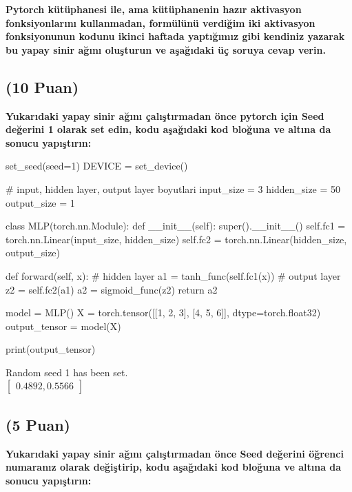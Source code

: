 \documentclass[11pt]{article}
\begin{document}
\vspace{.2in}
 \textbf{Pytorch kütüphanesi ile, ama kütüphanenin hazır aktivasyon fonksiyonlarını kullanmadan, formülünü verdiğim iki aktivasyon fonksiyonunun kodunu ikinci haftada yaptığımız gibi kendiniz yazarak bu yapay sinir ağını oluşturun ve aşağıdaki üç soruya cevap verin.}
 
\subsection{(10 Puan)} \textbf{Yukarıdaki yapay sinir ağını çalıştırmadan önce pytorch için Seed değerini 1 olarak set edin, kodu aşağıdaki kod bloğuna ve altına da sonucu yapıştırın:}

\begin{python}
set_seed(seed=1)
DEVICE = set_device()

# input, hidden layer, output layer boyutlari
input_size = 3
hidden_size = 50
output_size = 1

class MLP(torch.nn.Module):
    def __init__(self):
        super().__init__()
        self.fc1 = torch.nn.Linear(input_size, hidden_size)
        self.fc2 = torch.nn.Linear(hidden_size, output_size)
    
    def forward(self, x):
        # hidden layer
        a1 = tanh_func(self.fc1(x))
        # output layer
        z2 = self.fc2(a1)
        a2 = sigmoid_func(z2)
        return a2
        
model = MLP()
X = torch.tensor([[1, 2, 3], [4, 5, 6]], dtype=torch.float32)
output_tensor = model(X)

print(output_tensor)
\end{python}

Random seed 1 has been set. \\
$\begin{bmatrix}0.4892, 0.5566\end{bmatrix}$

\subsection{(5 Puan)} \textbf{Yukarıdaki yapay sinir ağını çalıştırmadan önce Seed değerini öğrenci numaranız olarak değiştirip, kodu aşağıdaki kod bloğuna ve altına da sonucu yapıştırın:}
\end{document}
